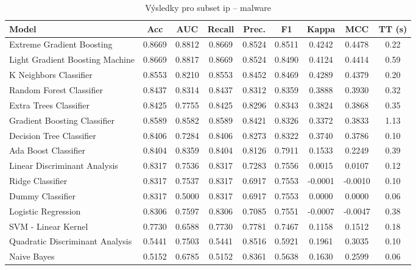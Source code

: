 \begin{table}[H]
  \centering
  \small
  \caption{Výsledky pro subset ip – malware}
  \begin{tabular}{|l|c|c|c|c|c|c|c|c|}
    \hline
    \textbf{Model} & \textbf{Acc} & \textbf{AUC} & \textbf{Recall} & \textbf{Prec.} & \textbf{F1} & \textbf{Kappa} & \textbf{MCC} & \textbf{TT (s)} \\
    \hline
    Extreme Gradient Boosting & 0.8669 & 0.8812 & 0.8669 & 0.8524 & 0.8511 & 0.4242 & 0.4478 & 0.22 \\
    Light Gradient Boosting Machine & 0.8669 & 0.8817 & 0.8669 & 0.8524 & 0.8490 & 0.4124 & 0.4414 & 0.59 \\
    K Neighbors Classifier & 0.8553 & 0.8210 & 0.8553 & 0.8452 & 0.8469 & 0.4289 & 0.4379 & 0.20 \\
    Random Forest Classifier & 0.8437 & 0.8314 & 0.8437 & 0.8312 & 0.8359 & 0.3888 & 0.3930 & 0.32 \\
    Extra Trees Classifier & 0.8425 & 0.7755 & 0.8425 & 0.8296 & 0.8343 & 0.3824 & 0.3868 & 0.35 \\
    Gradient Boosting Classifier & 0.8589 & 0.8582 & 0.8589 & 0.8421 & 0.8326 & 0.3372 & 0.3833 & 1.13 \\
    Decision Tree Classifier & 0.8406 & 0.7284 & 0.8406 & 0.8273 & 0.8322 & 0.3740 & 0.3786 & 0.10 \\
    Ada Boost Classifier & 0.8404 & 0.8359 & 0.8404 & 0.8126 & 0.7911 & 0.1533 & 0.2249 & 0.39 \\
    Linear Discriminant Analysis & 0.8317 & 0.7536 & 0.8317 & 0.7283 & 0.7556 & 0.0015 & 0.0107 & 0.12 \\
    Ridge Classifier & 0.8317 & 0.7537 & 0.8317 & 0.6917 & 0.7553 & -0.0001 & -0.0010 & 0.10 \\
    Dummy Classifier & 0.8317 & 0.5000 & 0.8317 & 0.6917 & 0.7553 & 0.0000 & 0.0000 & 0.06 \\
    Logistic Regression & 0.8306 & 0.7597 & 0.8306 & 0.7085 & 0.7551 & -0.0007 & -0.0047 & 0.38 \\
    SVM - Linear Kernel & 0.7730 & 0.6588 & 0.7730 & 0.7781 & 0.7467 & 0.1158 & 0.1512 & 0.18 \\
    Quadratic Discriminant Analysis & 0.5441 & 0.7503 & 0.5441 & 0.8516 & 0.5921 & 0.1961 & 0.3035 & 0.10 \\
    Naive Bayes & 0.5152 & 0.6785 & 0.5152 & 0.8361 & 0.5638 & 0.1630 & 0.2599 & 0.06 \\
    \hline
  \end{tabular}
\end{table}
\vspace{0.5cm}

